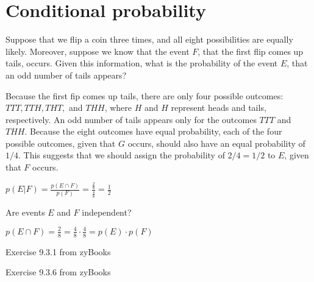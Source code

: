 \documentclass[]{exam}
\begin{document}
  \begin{center}
  \end{center}

  \section*{Conditional probability}

  \begin{questions}
    \question Suppose that we flip a coin three times, and all eight
      possibilities are equally likely. Moreover, suppose we know that the event
      $F$, that the first flip comes up tails, occurs. Given this information,
      what is the probability of the event $E$, that an odd number of tails
      appears?
      \begin{solution}
        Because the first fip comes up tails, there are only four possible
        outcomes: $TTT, TTH, THT,$ and $THH$, where $H$ and $H$ represent heads
        and tails, respectively. An odd number of tails appears only for the
        outcomes $TTT$ and $THH$. Because the eight outcomes have equal
        probability, each of the four possible outcomes, given that $G$ occurs,
        should also have an equal probability of $1/4$. This suggests that we
        should assign the probability of $2/4=1/2$ to $E$, given that $F$
        occurs.

        $p(E|F)=\frac{p(E \cap F)}{p(F)}=\frac{\frac{2}{8}}{\frac{4}{8}}=\frac{1}{2}$
      \end{solution}

    \question Are events $E$ and $F$ independent?
      \begin{solution}
        $p(E \cap F)=\frac{2}{8}=\frac{4}{8}\cdot\frac{4}{8}=p(E)\cdot p(F)$
      \end{solution}

    \question Exercise 9.3.1 from zyBooks

    \question Exercise 9.3.6 from zyBooks
  \end{questions}
\end{document}
